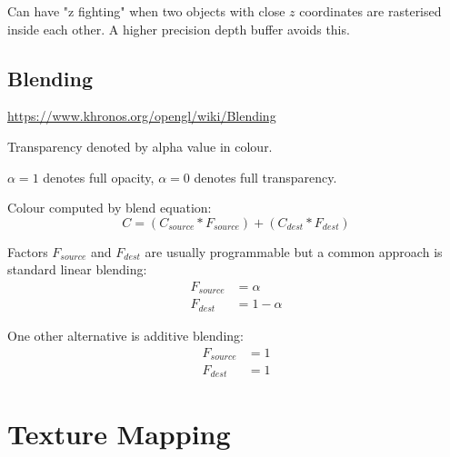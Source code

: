 \documentclass[a4paper]{article}
\begin{document}
Can have "z fighting" when two objects with close $z$ coordinates are rasterised
inside each other. A higher precision depth buffer avoids this.

\subsection{Blending}

\url{https://www.khronos.org/opengl/wiki/Blending}

Transparency denoted by alpha value in colour.

$\alpha = 1$ denotes full opacity, $\alpha = 0$ denotes full transparency.

Colour computed by blend equation:
\[
  C = (C_{source} * F_{source}) + (C_{dest} * F_{dest})
\]

Factors $F_{source}$ and $F_{dest}$ are usually programmable but a common
approach is standard linear blending:
\begin{align*}
  F_{source} &= \alpha \\
  F_{dest} &= 1 - \alpha
\end{align*}

One other alternative is additive blending:
\begin{align*}
  F_{source} &= 1 \\
  F_{dest} &= 1
\end{align*}

\section{Texture Mapping}
\end{document}

